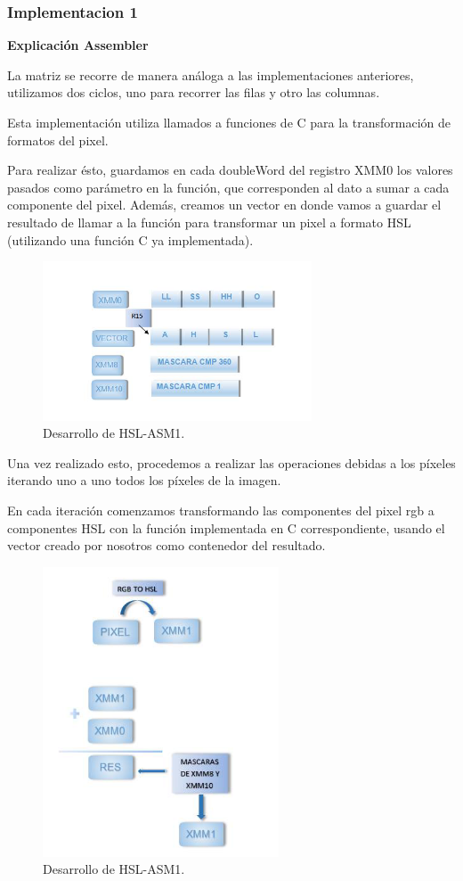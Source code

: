 \subsubsection{Implementacion 1}

\textbf{Explicación Assembler}

La matriz se recorre de manera análoga a las implementaciones anteriores, utilizamos dos ciclos, uno para recorrer las filas y otro las columnas.

Esta implementación utiliza llamados a funciones de C para la transformación de formatos del pixel.

Para realizar ésto, guardamos en cada doubleWord del registro XMM0 los valores pasados como parámetro en la función, que corresponden al dato a sumar a cada componente del pixel.
Además, creamos un vector en donde vamos a guardar el resultado de llamar a la función para transformar un pixel a formato HSL (utilizando una función C ya implementada).

\begin{figure}[ht!]
\centering
\includegraphics[width=80mm]{imagenes/hsl/hsl1-1.png}
\caption{Desarrollo de HSL-ASM1.}
\end{figure}

Una vez realizado esto, procedemos a realizar las operaciones debidas a los píxeles iterando uno a uno todos los píxeles de la imagen.

En cada iteración comenzamos transformando las componentes del pixel rgb a componentes HSL con la función implementada en C correspondiente, usando el vector creado por nosotros como contenedor del resultado.

\begin{figure}
\centering
\includegraphics[width=70mm]{imagenes/hsl/hsl1-2.png}
\caption{Desarrollo de HSL-ASM1.}
\end{figure}

